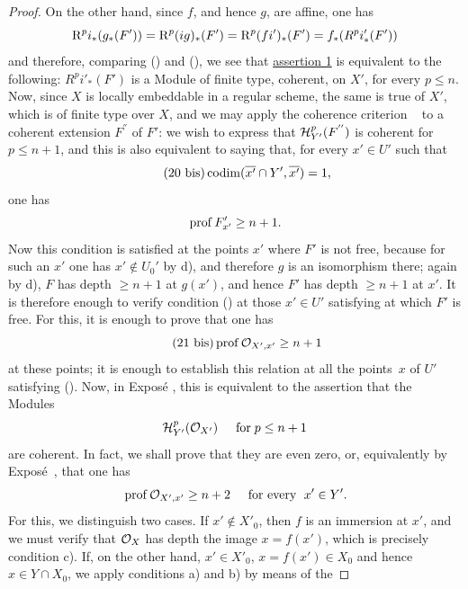 \begin{proof}
On the other hand, since $f$, and hence $g$, are affine, one has
\steco
\begin{equation} \label{eq:XII.20} {}\R^pi_\ast(g_\ast(F')) = \R^p(ig)_\ast(F') = \R^p(fi')_\ast(F') = f_\ast(R^pi'_\ast(F'))
\end{equation}
and therefore, comparing () and (), we see that \hyperref[XII.4.1]{assertion 1}\sisi{${}^\circ$}{} is equivalent to the following: $R^pi'_\ast(F')$ is a Module of finite type, \ie coherent, on $X'$, for every $p\leq n$. Now, since $X$ is locally embeddable in a regular scheme, the same is true of $X'$, which is of finite type over $X$, and we may apply the coherence criterion ~ to a coherent extension $F^{''}$ of $F'$: we wish to express that $\SheafH^p\sisi{_Y}{_{Y'}}(F^{''})$ is coherent for $p\leq n+1$, and this is also equivalent to saying that, for every $x'\in U'$ such that
\begin{equation*} \label{eq:XII.20bis} \tag{20 bis} {}\codim (\overline{x'}\cap Y', \overline{x'})=1,
\end{equation*}
one has
\steco
\begin{equation} \label{eq:XII.21} {} \prof F'_{x'}\geq n+1.
\end{equation}
Now this condition is satisfied at the points $x'$ where $F'$ is not free, because for such an $x'$ one has $x'\notin U_0'$ by d), and therefore $g$ is an isomorphism there; again by d), $F$ has depth $\geq n+1$ at $g(x')$, and hence $F'$ has depth $\geq n+1$ at $x'$. It is therefore enough to verify condition () at those $x'\in U'$ satisfying  at which $F'$ is free. For this, it is enough to prove that one has\pageoriginale
\begin{equation*} \label{eq:XII.21bis} \tag{21 bis}
\prof \Oo_{X', x'}\geq n+1
\end{equation*}
\enlargethispage{\baselineskip}%
at these points; \afortiori it is enough to establish this relation at all the points~$x$ of $U'$ satisfying (). Now,  in Expos\'e , this is equivalent to the assertion that the Modules
\[
\SheafH^p_{Y'}(\Oo_{X'}) \hspace{5mm} \text{for} \; p\leq n+1
\]
are coherent. In fact, we shall prove that they are even zero, or, equivalently by Expos\'e~, that one has
\steco
\begin{equation} \label{eq:XII.22} {} \prof \Oo_{X', x'}\geq n+2 \hspace{5mm} \text{for every }\; x'\in Y'.
\end{equation}
For this, we distinguish two cases. If $x'\notin X'_0$, then $f$ is an immersion at $x'$, and we must verify that $\sisi{F}{\Oo_X}$ has depth  the image $x=f(x')$, which is precisely condition c). If, on the other hand, $x'\in X'_0$, \ie $x=f(x')\in X_0$ and hence $x\in Y\cap X_0$, we apply conditions a) and b) by means of the


\end{proof}
